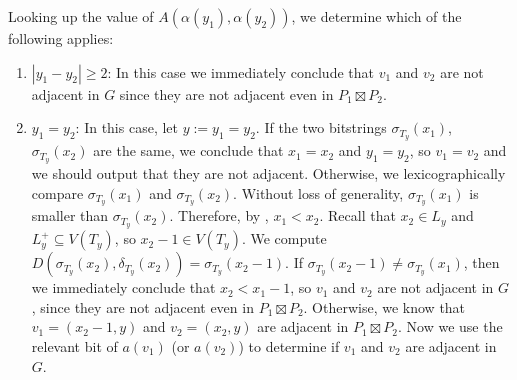 \documentclass[kpfonts]{patmorin}
\let\ge\geqslant
\begin{document}
Looking up the value of $A(\alpha(y_1),\alpha(y_2))$, we determine which of the following applies:
\begin{enumerate}
  \item $|y_1-y_2|\ge 2$: In this case we immediately conclude that $v_1$ and $v_2$ are not adjacent in $G$ since they are not adjacent even in $P_1\boxtimes P_2$. %

  \item $y_1=y_2$: In this case, let $y:=y_1=y_2$.
  If the two bitstrings $\sigma_{T_y}(x_1)$, $\sigma_{T_y}(x_2)$ are the same,
  we conclude that $x_1=x_2$ and $y_1=y_2$, so $v_1=v_2$ and we should output that they are not adjacent.
  Otherwise, we
  lexicographically compare $\sigma_{T_y}(x_1)$ and $\sigma_{T_y}(x_2)$.
  Without loss of generality, $\sigma_{T_y}(x_1)$ is smaller than $\sigma_{T_y}(x_2)$.
  Therefore, by , $x_1<x_2$.
  Recall that $x_2 \in L_y$ and $L^+_y\subseteq V(T_y)$, so $x_2-1 \in V(T_y)$.
  We compute $D(\sigma_{T_y}(x_2),\delta_{T_y}(x_2))=\sigma_{T_y}(x_2-1)$. If $\sigma_{T_y}(x_2-1)\neq \sigma_{T_y}(x_1)$, then we immediately conclude that $x_2 < x_1-1$, so $v_1$ and $v_2$ are not adjacent in $G$, since they are not adjacent even in $P_1\boxtimes P_2$.  Otherwise, we know that
  $v_1=(x_2-1,y)$ and $v_2=(x_2,y)$ are adjacent in $P_1\boxtimes P_2$.
  Now we use the relevant bit of $a(v_1)$ (or $a(v_2)$) to determine if $v_1$ and $v_2$ are adjacent in $G$.


\end{enumerate}
\end{document}
